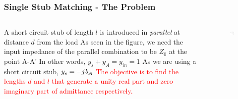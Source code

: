 \documentclass[10pt, compress]{beamer}
\renewcommand{\j}{{j}\mkern1mu} %
\begin{document}
\begin{frame}
    \frametitle{Single Stub Matching - The Problem}
    \begin{columns}[]
        \begin{column}[]{.5\textwidth}
            \begin{outline}
                \1 A short circuit stub of length $l$ is introduced in \textit{parallel} at distance $d$ from the load
                \1 As seen in the figure, we need the input impedance of the parallel combination to be $Z_0$ at the point A-A'
                \1 In other words, $y_s + y_A = y_{in} = 1$
                \1 As we are using a short circuit stub, $y_s = - \j b_A$
                \1 \textcolor{red}{The objective is to find the lengths $d$ and $l$ that generate a unity real part and zero imaginary part of admittance respectively.}
            \end{outline}  
        \end{column}
        \begin{column}[]{.5\textwidth}
            \begin{figure}[]
                \centering
                \includegraphics[width=.9\textwidth]{tline_single_stub.pdf}
            \end{figure}
        \end{column}
    \end{columns}
\end{frame}
\end{document}
